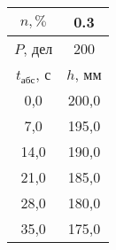 \begin{tabular}[t]{|c|c|}
\hline
$n, \%$ & 0.3 \\
\hline
$P$, дел & 200 \\
\hline
$t_{абс}$, с & $h$, мм \\ 
\hline
0,0 & 200,0 \\ 
7,0 & 195,0 \\ 
14,0 & 190,0 \\ 
21,0 & 185,0 \\ 
28,0 & 180,0 \\ 
35,0 & 175,0 \\ 
\hline
\end{tabular}